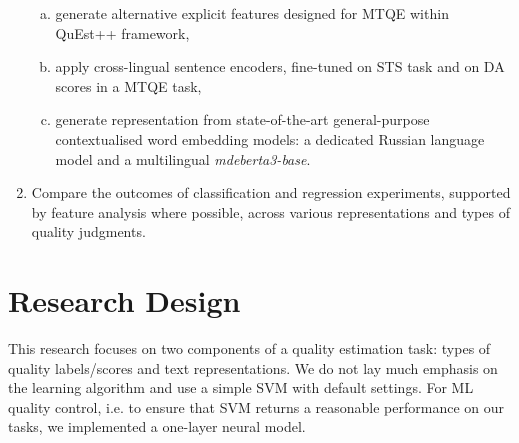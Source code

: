 \begin{enumerate}
\begin{enumerate}[(a)]
		\item generate alternative explicit features designed for \gls*{MTQE} within QuEst++ framework, 
		\item apply cross-lingual sentence encoders, fine-tuned on \gls{STS} task and on DA scores in a \gls*{MTQE} task, %
		\item generate representation from state-of-the-art general-purpose contextualised word embedding models: a dedicated Russian language model and a multilingual \textit{mdeberta3-base}.
	\end{enumerate} 
	\item Compare the outcomes of classification and regression experiments, supported by feature analysis where possible, across various representations and types of quality judgments.
\end{enumerate}

\section{\label{ssec:design}Research Design} 
This research focuses on two components of a quality estimation task: types of quality labels/scores and text representations. We do not lay much emphasis on the learning algorithm and use a simple \gls{SVM} with default settings. For ML quality control, i.e. to ensure that SVM returns a reasonable performance on our tasks, we implemented a one-layer neural model.

